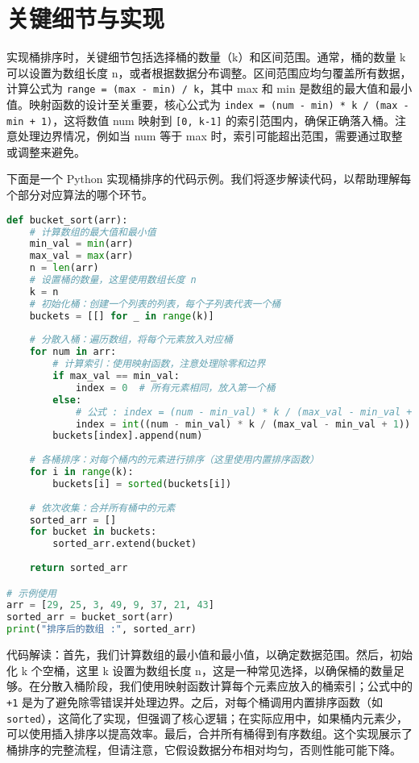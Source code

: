 \chapter{关键细节与实现}
实现桶排序时，关键细节包括选择桶的数量（k）和区间范围。通常，桶的数量 k 可以设置为数组长度 n，或者根据数据分布调整。区间范围应均匀覆盖所有数据，计算公式为 \texttt{range = (max - min) / k}，其中 max 和 min 是数组的最大值和最小值。映射函数的设计至关重要，核心公式为 \texttt{index = (num - min) * k / (max - min + 1)}，这将数值 num 映射到 \texttt{[0, k-1]} 的索引范围内，确保正确落入桶。注意处理边界情况，例如当 num 等于 max 时，索引可能超出范围，需要通过取整或调整来避免。\par
下面是一个 Python 实现桶排序的代码示例。我们将逐步解读代码，以帮助理解每个部分对应算法的哪个环节。\par
\begin{lstlisting}[language=python]
def bucket_sort(arr):
    # 计算数组的最大值和最小值
    min_val = min(arr)
    max_val = max(arr)
    n = len(arr)
    # 设置桶的数量，这里使用数组长度 n
    k = n
    # 初始化桶：创建一个列表的列表，每个子列表代表一个桶
    buckets = [[] for _ in range(k)]
    
    # 分散入桶：遍历数组，将每个元素放入对应桶
    for num in arr:
        # 计算索引：使用映射函数，注意处理除零和边界
        if max_val == min_val:
            index = 0  # 所有元素相同，放入第一个桶
        else:
            # 公式 : index = (num - min_val) * k / (max_val - min_val + 1)
            index = int((num - min_val) * k / (max_val - min_val + 1))
        buckets[index].append(num)
    
    # 各桶排序：对每个桶内的元素进行排序（这里使用内置排序函数）
    for i in range(k):
        buckets[i] = sorted(buckets[i])
    
    # 依次收集：合并所有桶中的元素
    sorted_arr = []
    for bucket in buckets:
        sorted_arr.extend(bucket)
    
    return sorted_arr

# 示例使用
arr = [29, 25, 3, 49, 9, 37, 21, 43]
sorted_arr = bucket_sort(arr)
print("排序后的数组 :", sorted_arr)
\end{lstlisting}
代码解读：首先，我们计算数组的最小值和最小值，以确定数据范围。然后，初始化 k 个空桶，这里 k 设置为数组长度 n，这是一种常见选择，以确保桶的数量足够。在分散入桶阶段，我们使用映射函数计算每个元素应放入的桶索引；公式中的 \texttt{+1} 是为了避免除零错误并处理边界。之后，对每个桶调用内置排序函数（如 \texttt{sorted}），这简化了实现，但强调了核心逻辑；在实际应用中，如果桶内元素少，可以使用插入排序以提高效率。最后，合并所有桶得到有序数组。这个实现展示了桶排序的完整流程，但请注意，它假设数据分布相对均匀，否则性能可能下降。\par
